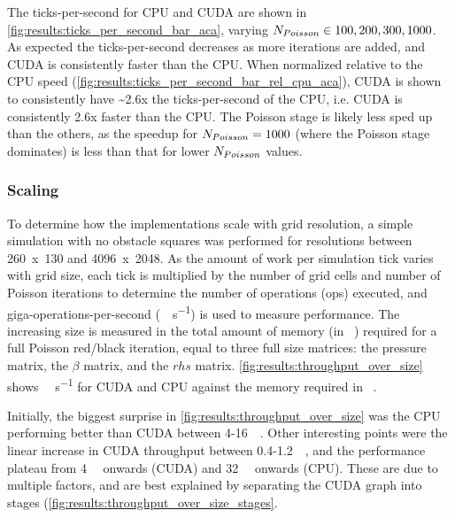 


The ticks-per-second for CPU and CUDA are shown in \cref{fig:results:ticks_per_second_bar_aca}, varying $N_{Poisson} \in {100, 200, 300, 1000}$.
As expected the ticks-per-second decreases as more iterations are added, and CUDA is consistently faster than the CPU.
When normalized relative to the CPU speed (\cref{fig:results:ticks_per_second_bar_rel_cpu_aca}), CUDA is shown to consistently have \textasciitilde{}2.6x the ticks-per-second of the CPU, i.e. CUDA is consistently 2.6x faster than the CPU. 
The Poisson stage is likely less sped up than the others, as the speedup for $N_{Poisson}{} = 1000$ (where the Poisson stage dominates) is less than that for lower $N_{Poisson}{}$ values.

\subsubsection{Scaling}
To determine how the implementations scale with grid resolution, a simple simulation with no obstacle squares was performed for resolutions between 260~x~130 and 4096~x~2048.
As the amount of work per simulation tick varies with grid size, each tick is multiplied by the number of grid cells and number of Poisson iterations to determine the number of operations (\si{op}s) executed, and  giga-operations-per-second (\si{\giga\op\per\second}) is used to measure performance.
The increasing size is measured in the total amount of memory (in \si{\mega\byte}) required for a full Poisson red/black iteration, equal to three full size matrices: the pressure matrix, the $\beta$ matrix, and the $rhs$ matrix.
\cref{fig:results:throughput_over_size} shows \si{\giga\op\per\second} for CUDA and CPU against the memory required in \si{\mega\byte}.



Initially, the biggest surprise in \cref{fig:results:throughput_over_size} was the CPU performing better than CUDA between 4-\SI{16}{\mega\byte}.
Other interesting points were the linear increase in CUDA throughput between 0.4-\SI{1.2}{\mega\byte}, and the performance plateau from \SI{4}{\mega\byte} onwards (CUDA) and \SI{32}{\mega\byte} onwards (CPU).
These are due to multiple factors, and are best explained by separating the CUDA graph into stages (\cref{fig:results:throughput_over_size_stages}.


